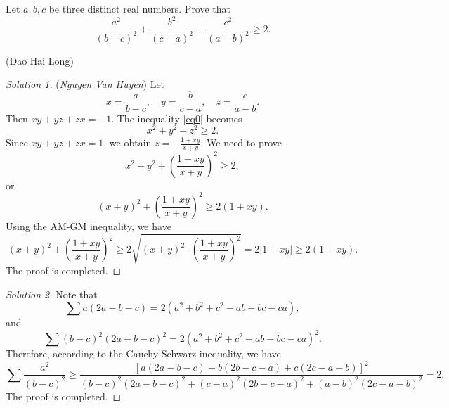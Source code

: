 \documentclass[12pt,a4paper]{book}
\begin{document}
\begin{pro_no_count}
Let $a, b, c$ be three distinct real numbers. Prove that
\begin{equation}\label{eq0}
\frac{a^2}{(b-c)^2}+\frac{b^2}{(c-a)^2}+\frac{c^2}{(a-b)^2} \geqslant 2.
\end{equation} 
\begin{flushright}(Dao Hai Long)\end{flushright}
\end{pro_no_count}

\begin{proof}[\cmss\problemColor Solution 1]
(\textit{Nguyen Van Huyen}) Let
\[x = \frac{a}{b-c}, \quad y = \frac{b}{c-a}, \quad z = \frac{c}{a-b}.\]
Then $xy+yz+zx=-1$. The inequality \eqref{eq0} becomes
\[x^2+y^2+z^2 \ge 2.\]
Since $xy+yz+zx=1$, we obtain $z = -\frac{1+xy}{x+y}$. We need to prove
\[x^2+y^2+\left(\frac{1+xy}{x+y}\right)^2 \ge 2,\]
or
\[(x+y)^2+\left(\frac{1+xy}{x+y}\right)^2 \ge 2(1+xy).\]
Using the AM-GM inequality, we have
\[(x+y)^2+\left(\frac{1+xy}{x+y}\right)^2 \ge 2\sqrt{(x+y)^2 \cdot \left(\frac{1+xy}{x+y}\right)^2} = 2|1+xy| \ge 2(1+xy).\]
The proof is completed.
\end{proof}

\begin{proof}[\cmss\problemColor Solution 2]
Note that
\[\sum a(2a-b-c)=2(a^2+b^2+c^2-ab-bc-ca),\]
and
\[\sum (b-c)^2(2a-b-c)^2=2(a^2+b^2+c^2-ab-bc-ca)^2.\]
Therefore, according to the Cauchy-Schwarz inequality, we have
\[\sum \frac{a^2}{(b-c)^2} \geqslant \frac{\left[a(2a-b-c)+b(2b-c-a)+c(2c-a-b)\right] ^2}{(b-c)^2(2a-b-c)^2+(c-a)^2(2b-c-a)^2+(a-b)^2(2c-a-b)^2}=2.\]
The proof is completed.
\end{proof}
\end{document}
